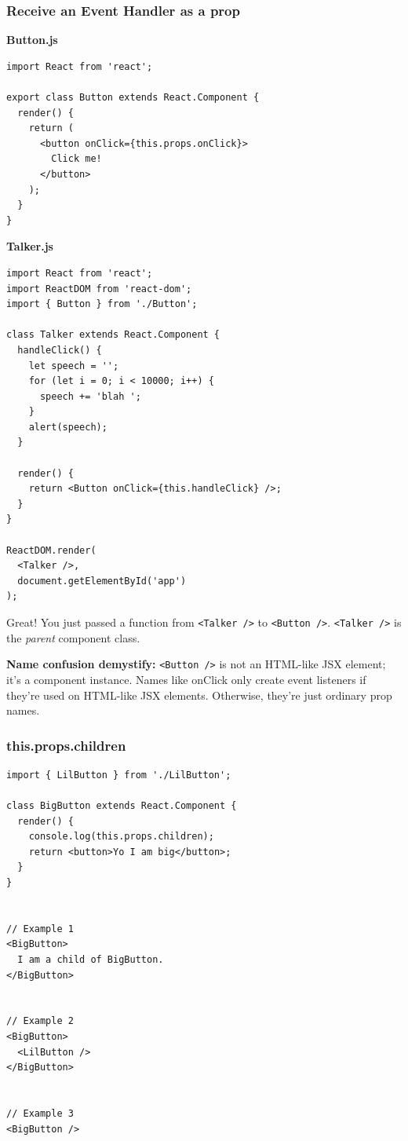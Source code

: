 \documentclass[a4paper, 12pt]{article}
\begin{document}
\subsubsection{Receive an Event Handler as a prop}
\textbf{Button.js}
\begin{verbatim}
import React from 'react';

export class Button extends React.Component {
  render() {
    return (
      <button onClick={this.props.onClick}>
        Click me!
      </button>
    );
  }
}
\end{verbatim}

\textbf{Talker.js}
\begin{verbatim}
import React from 'react';
import ReactDOM from 'react-dom';
import { Button } from './Button';

class Talker extends React.Component {
  handleClick() {
    let speech = '';
    for (let i = 0; i < 10000; i++) {
      speech += 'blah ';
    }
    alert(speech);
  }
  
  render() {
    return <Button onClick={this.handleClick} />;
  }
}

ReactDOM.render(
  <Talker />,
  document.getElementById('app')
);
\end{verbatim}

Great! You just passed a function from \verb|<Talker />| to \verb|<Button />|. \verb|<Talker />| is the \textit{parent} component class.

\textbf{Name confusion demystify: }\verb|<Button />| is not an HTML-like JSX element; it's a component instance. Names like onClick only create event listeners if they're used on HTML-like JSX elements. Otherwise, they're just ordinary prop names.

\subsubsection{this.props.children}
\begin{verbatim}
import { LilButton } from './LilButton';

class BigButton extends React.Component {
  render() {
    console.log(this.props.children);
    return <button>Yo I am big</button>;
  }
}


// Example 1
<BigButton>
  I am a child of BigButton.
</BigButton>


// Example 2
<BigButton>
  <LilButton />
</BigButton>


// Example 3
<BigButton />
\end{verbatim}
\end{document}
